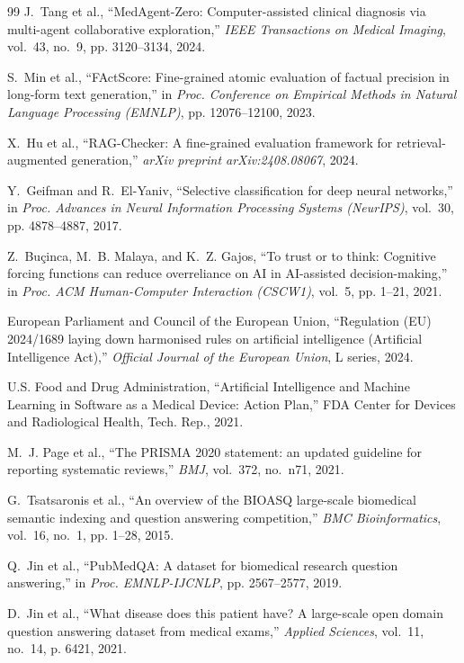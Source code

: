 \documentclass[12pt,a4paper]{report}
\begin{document}
\begin{thebibliography}{99}
J.~Tang et al., ``MedAgent-Zero: Computer-assisted clinical diagnosis via multi-agent collaborative exploration,'' \emph{IEEE Transactions on Medical Imaging}, vol.~43, no.~9, pp. 3120--3134, 2024.

S.~Min et al., ``FActScore: Fine-grained atomic evaluation of factual precision in long-form text generation,'' in \emph{Proc. Conference on Empirical Methods in Natural Language Processing (EMNLP)}, pp. 12076--12100, 2023.

X.~Hu et al., ``RAG-Checker: A fine-grained evaluation framework for retrieval-augmented generation,'' \emph{arXiv preprint arXiv:2408.08067}, 2024.

Y.~Geifman and R.~El-Yaniv, ``Selective classification for deep neural networks,'' in \emph{Proc. Advances in Neural Information Processing Systems (NeurIPS)}, vol.~30, pp. 4878--4887, 2017.

Z.~Bu\c{c}inca, M.~B. Malaya, and K.~Z. Gajos, ``To trust or to think: Cognitive forcing functions can reduce overreliance on AI in AI-assisted decision-making,'' in \emph{Proc. ACM Human-Computer Interaction (CSCW1)}, vol.~5, pp. 1--21, 2021.

European Parliament and Council of the European Union, ``Regulation (EU) 2024/1689 laying down harmonised rules on artificial intelligence (Artificial Intelligence Act),'' \emph{Official Journal of the European Union}, L series, 2024.

U.S. Food and Drug Administration, ``Artificial Intelligence and Machine Learning in Software as a Medical Device: Action Plan,'' FDA Center for Devices and Radiological Health, Tech. Rep., 2021.

M.~J. Page et al., ``The PRISMA 2020 statement: an updated guideline for reporting systematic reviews,'' \emph{BMJ}, vol.~372, no.~n71, 2021.

G.~Tsatsaronis et al., ``An overview of the BIOASQ large-scale biomedical semantic indexing and question answering competition,'' \emph{BMC Bioinformatics}, vol.~16, no.~1, pp. 1--28, 2015.

Q.~Jin et al., ``PubMedQA: A dataset for biomedical research question answering,'' in \emph{Proc. EMNLP-IJCNLP}, pp. 2567--2577, 2019.

D.~Jin et al., ``What disease does this patient have? A large-scale open domain question answering dataset from medical exams,'' \emph{Applied Sciences}, vol.~11, no.~14, p. 6421, 2021.


\end{thebibliography}
\end{document}
